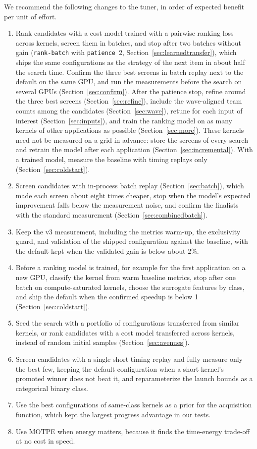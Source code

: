 \documentclass[10pt]{article}
\newcommand{\code}[1]{\texttt{#1}}
\begin{document}
We recommend the following changes to the tuner, in order of expected
benefit per unit of effort.
\begin{enumerate}
\item Rank candidates with a cost model trained with a pairwise ranking loss
  across kernels, screen them in batches, and stop after two batches without
  gain (\code{rank-batch} with \code{patience}~2,
  Section~\ref{sec:learnedtransfer}), which ships the same configurations as
  the strategy of the next item in about half the search time. Confirm the
  three best screens in batch replay next to the default on the same GPU, and
  run the measurements before the search on several GPUs
  (Section~\ref{sec:confirm}). After the patience stop, refine around the three
  best screens (Section~\ref{sec:refine}), include the wave-aligned team
  counts among the candidates (Section~\ref{sec:wave}), retune for each input of interest
  (Section~\ref{sec:inputs}), and train the ranking model on as many kernels of
  other applications as possible (Section~\ref{sec:more}). These kernels need not
  be measured on a grid in advance: store the screens of every search and retrain the
  model after each application (Section~\ref{sec:incremental}). With a trained
  model, measure the baseline with timing replays only
  (Section~\ref{sec:coldstart}).
\item Screen candidates with in-process batch replay (Section~\ref{sec:batch}),
  which made each screen about eight times cheaper, stop when the model's
  expected improvement falls below the measurement noise, and confirm the
  finalists with the standard measurement (Section~\ref{sec:combinedbatch}).
\item Keep the v3 measurement, including the metrics warm-up, the exclusivity
  guard, and validation of the shipped configuration against the baseline,
  with the default kept when the validated gain is below about 2\%.
\item Before a ranking model is trained, for example for the first
  application on a new GPU, classify the kernel from warm baseline metrics, stop
  after one batch on compute-saturated kernels, choose the surrogate features by
  class, and ship the default when the confirmed speedup is below 1
  (Section~\ref{sec:coldstart}).
\item Seed the search with a portfolio of configurations transferred from
  similar kernels, or rank candidates with a cost model transferred across
  kernels, instead of random initial samples (Section~\ref{sec:avenues}).
\item Screen candidates with a single short timing replay and fully measure
  only the best few, keeping the default configuration when a short kernel's
  promoted winner does not beat it, and reparameterize the launch bounds as a
  categorical binary class.
\item Use the best configurations of same-class kernels as a prior for the
  acquisition function, which kept the largest progress advantage in our
  tests.
\item Use MOTPE when energy matters, because it finds the time-energy
  trade-off at no cost in speed.
\end{enumerate}
\end{document}
